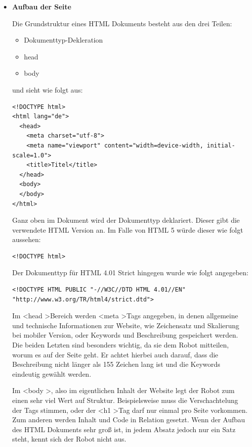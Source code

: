 {    \begin{itemize}
      \item \textbf{Aufbau der Seite}

        Die Grundstruktur eines HTML Dokuments besteht aus den drei Teilen:

        \begin{itemize}
          \item Dokumenttyp-Dekleration
          \item head
          \item body
        \end{itemize}

        und sieht wie folgt aus:

\lstset{language = html}
\begin{lstlisting}
<!DOCTYPE html>
<html lang="de">
  <head>
    <meta charset="utf-8">
    <meta name="viewport" content="width=device-width, initial-scale=1.0">
    <title>Titel</title>
  </head>
  <body>
  </body>
</html>
\end{lstlisting}

        Ganz oben im Dokument wird der Dokumenttyp deklariert. Dieser gibt die verwendete HTML Version an. Im Falle von HTML 5 würde dieser wie folgt aussehen:

\lstset{language = html}
\begin{lstlisting}
<!DOCTYPE html>
\end{lstlisting}

        Der Dokumenttyp für HTML 4.01 Strict hingegen wurde wie folgt angegeben:

\lstset{language = html}
\begin{lstlisting}
<!DOCTYPE HTML PUBLIC "-//W3C//DTD HTML 4.01//EN"
"http://www.w3.org/TR/html4/strict.dtd">
\end{lstlisting}

        Im \textless head \textgreater Bereich werden \textless meta \textgreater Tags angegeben, in denen allgemeine und technische Informationen zur Website, wie Zeichensatz
        und Skalierung bei mobiler Version, oder Keywords und Beschreibung gespeichert werden.
        Die beiden Letzten sind besonders wichtig, da sie dem Robot mitteilen, worum es auf der Seite geht. Er achtet hierbei auch darauf, dass die Beschreibung nicht
        länger als 155 Zeichen lang ist und die Keywords eindeutig gewählt werden.

        Im \textless body \textgreater, also im eigentlichen Inhalt der Website legt der Robot zum einen sehr viel Wert auf Struktur. Beispielsweise muss die Verschachtelung der Tags stimmen,
        oder der \textless h1 \textgreater Tag darf nur einmal pro Seite vorkommen.
        Zum anderen werden Inhalt und Code in Relation gesetzt. Wenn der Aufbau des HTML Dokuments sehr groß ist, in jedem Absatz jedoch nur ein Satz steht, kennt sich der Robot nicht aus.


\end{itemize}}
